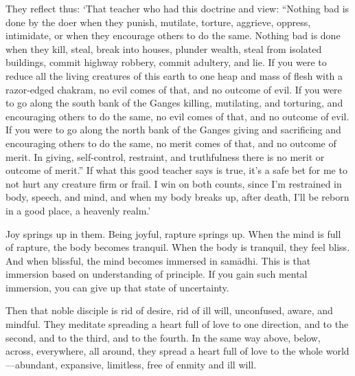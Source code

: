 \documentclass[12pt,openany]{book}%
\begin{document}
They reflect thus: ‘That teacher who had this doctrine and view: “Nothing bad is done by the doer when they punish, mutilate, torture, aggrieve, oppress, intimidate, or when they encourage others to do the same. Nothing bad is done when they kill, steal, break into houses, plunder wealth, steal from isolated buildings, commit highway robbery, commit adultery, and lie. If you were to reduce all the living creatures of this earth to one heap and mass of flesh with a razor-edged chakram, no evil comes of that, and no outcome of evil. If you were to go along the south bank of the Ganges killing, mutilating, and torturing, and encouraging others to do the same, no evil comes of that, and no outcome of evil. If you were to go along the north bank of the Ganges giving and sacrificing and encouraging others to do the same, no merit comes of that, and no outcome of merit. In giving, self-control, restraint, and truthfulness there is no merit or outcome of merit.” If what this good teacher says is true, it’s a safe bet for me to not hurt any creature firm or frail. I win on both counts, since I’m restrained in body, speech, and mind, and when my body breaks up, after death, I’ll be reborn in a good place, a heavenly realm.’ 

Joy springs up in them. Being joyful, rapture springs up. When the mind is full of rapture, the body becomes tranquil. When the body is tranquil, they feel bliss. And when blissful, the mind becomes immersed in \textsanskrit{samādhi}. This is that immersion based on understanding of principle. If you gain such mental immersion, you can give up that state of uncertainty. 

Then that noble disciple is rid of desire, rid of ill will, unconfused, aware, and mindful. They meditate spreading a heart full of love to one direction, and to the second, and to the third, and to the fourth. In the same way above, below, across, everywhere, all around, they spread a heart full of love to the whole world—abundant, expansive, limitless, free of enmity and ill will. 
\end{document}

